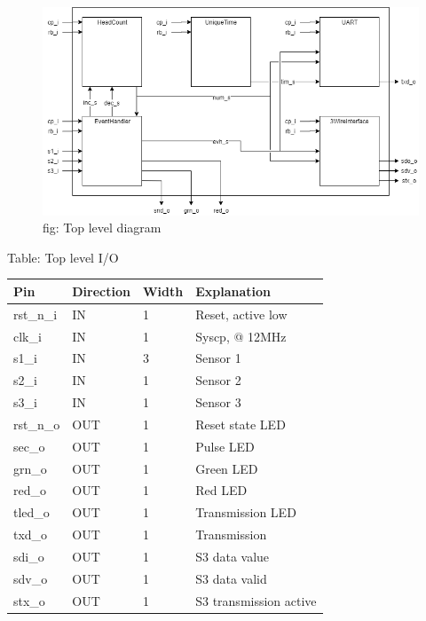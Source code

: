 \documentclass[12pt,a4 paper] {report}
\begin{document}
\begin{figure}[h]
	\centering	
	\includegraphics[scale=0.3]{../png/top.png}
	fig: Top level diagram\\
\end{figure}

\newpage

 Table: Top level I/O \\
\begin{center}
	\begin{tabular}{ |p{2cm}|p{2cm}|p{1cm}|p{5cm}| } 
	\hline
	Pin & Direction & Width & Explanation \\
	\hline
	rst\_n\_i & IN & 1 & Reset, active low \\
	\hline
	clk\_i & IN & 1 & Syscp, @ 12MHz \\
	\hline
	s1\_i & IN & 3 & Sensor 1 \\
	\hline
	s2\_i & IN & 1 & Sensor 2 \\
	\hline
	s3\_i & IN & 1 & Sensor 3 \\
	\hline
	rst\_n\_o & OUT & 1 & Reset state LED \\
	\hline
	sec\_o & OUT & 1 & Pulse LED \\
	\hline
	grn\_o & OUT & 1 & Green LED \\
	\hline
	red\_o & OUT & 1 & Red LED\\
	\hline
	tled\_o & OUT & 1 & Transmission LED \\
	\hline
	txd\_o & OUT & 1 & Transmission \\
	\hline
	sdi\_o & OUT & 1 & S3 data value \\
	\hline
	sdv\_o & OUT &  1& S3 data valid \\
	\hline
	stx\_o & OUT & 1 & S3 transmission active \\
	\hline
	
	\end{tabular}
\end{center}
\end{document}
